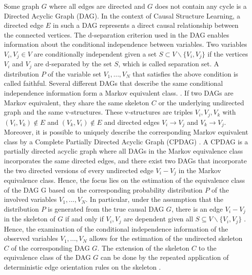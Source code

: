 Some graph $G$ where all edges are directed and $G$ does not contain any cycle is a Directed Acyclic Graph (DAG). In the context of Causal Structure Learning, a directed edge $E$ in such a DAG represents a direct causal relationship between the connected vertices.
The d-separation criterion used in the DAG enables information about the conditional independence between variables. Two variables $V_i, V_j \in V$ are conditionally independent given a set $S \subset V \backslash \{V_i, V_j\}$ if the vertices $V_i$ and $V_j$ are d-separated by the set $S$, which is called separation set.
A distribution $P$ of the variable set $V_1, ..., V_N$ that satisfies the above condition is called faithful.
Several different DAGs that describe the same conditional independence information form a Markov equivalent class. \cite{anderssonCharacterizationMarkovEquivalence1997}. If two DAGs are Markov equivalent, they share the same skeleton $C$ or the underlying undirected graph and the same v-structures.
These v-structures are triples $V_i,V_j,V_k$ with $(V_i,V_k) \notin E$ and $(V_k,V_i) \notin E$ and directed edges $V_i \rightarrow V_j$ and $V_k \rightarrow V_j$. Moreover, it is possible to uniquely describe the corresponding Markov equivalent class by a Complete Partially Directed Acyclic Graph (CPDAG) \cite{chickeringOptimalStructureIdentification2003}.
A CPDAG is a partially directed acyclic graph where all DAGs in the Markov equivalence class incorporates the same directed edges, and there exist two DAGs that incorporate the two directed versions of every undirected edge $V_i - V_j$ in the Markov equivalence class.
Hence, the focus lies on the estimation of the equivalence class of the DAG G based on the corresponding probability distribution $P$ of the involved variables $V_1,...,V_N$. In particular, under the assumption that the distribution $P$ is generated from the true causal DAG $G$, there is an edge $V_i - V_j$ in the skeleton of $G$ if and only if $V_i,V_j$ are dependent given all $S \subseteq V\backslash \{V_i,V_j\}$ \cite{spirtesCausationPredictionSearch1993}.
Hence, the examination of the conditional independence information of the observed variables $V_1,...,V_N$ allows for the estimation of the undirected skeleton $C$ of the corresponding DAG $G$. The extension of the skeleton $C$ to the equivalence class of the DAG $G$ can be done by the repeated application of deterministic edge orientation rules on the skeleton \cite{colomboOrderIndependentConstraintBasedCausal,kalischEstimatingHighDimensionalDirected2007,pearlIntroductionCausalInference2010}.

